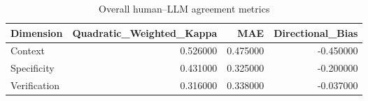 \begin{table}
\caption{Overall human--LLM agreement metrics}
\label{tab:rq1-overall-agreement}
\begin{tabular}{lrrr}
\toprule
Dimension & Quadratic_Weighted_Kappa & MAE & Directional_Bias \\
\midrule
Context & 0.526000 & 0.475000 & -0.450000 \\
Specificity & 0.431000 & 0.325000 & -0.200000 \\
Verification & 0.316000 & 0.338000 & -0.037000 \\
\bottomrule
\end{tabular}
\end{table}
